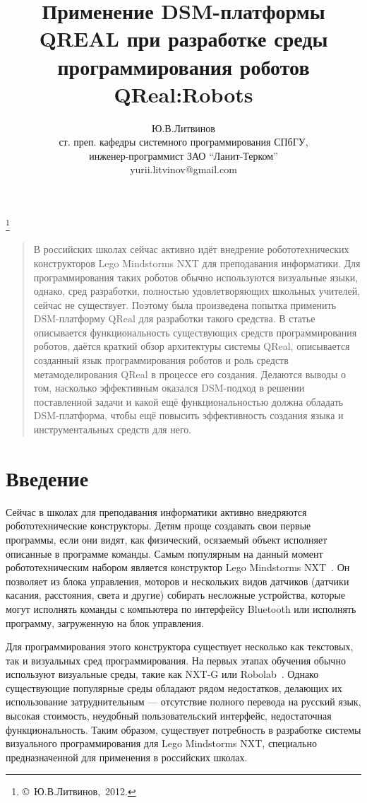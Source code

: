 \documentclass[a4paper]{article}
\title{Применение DSM-платформы QREAL при разработке среды программирования роботов QReal:Robots}
\author{Ю.В.Литвинов \\ ст. преп. кафедры системного программирования СПбГУ, \\ инженер-программист ЗАО ``Ланит-Терком'' \\ yurii.litvinov@gmail.com}
\date{}
\begin{document}
\maketitle
\thispagestyle{empty}

\renewcommand{\thefootnote}{}
\footnote{\small{\copyright~Ю.В.Литвинов,~2012.}}
\renewcommand{\thefootnote}{\arabic{footnote}}
\setcounter{footnote}{0}

\begin{quote}
\small\noindent
В российских школах сейчас активно идёт внедрение робототехнических конструкторов Lego Mindstorms NXT для преподавания информатики. Для программирования таких роботов обычно используются визуальные языки, однако, сред разработки, полностью удовлетворяющих школьных учителей, сейчас не существует. Поэтому была произведена попытка применить DSM-платформу QReal для разработки такого средства. В статье описывается функциональность существующих средств программирования роботов, даётся краткий обзор архитектуры системы QReal, описывается созданный язык программирования роботов и роль средств метамоделирования QReal в процессе его создания. Делаются выводы о том, насколько эффективным оказался DSM-подход в решении поставленной задачи и какой ещё функциональностью должна обладать DSM-платформа, чтобы ещё повысить эффективность создания языка и инструментальных средств для него.
\end{quote}

\section*{Введение}
Сейчас в школах для преподавания информатики активно внедряются робототехнические конструкторы. Детям проще создавать свои первые программы, если они видят, как физический, осязаемый объект исполняет описанные в программе команды. Самым популярным на данный момент робототехническим набором является конструктор Lego Mindstorms NXT~\cite{legoNxt}. Он позволяет из блока управления, моторов и нескольких видов датчиков (датчики касания, расстояния, света и другие) собирать несложные устройства, которые могут исполнять команды с компьютера по интерфейсу Bluetooth или исполнять программу, загруженную на блок управления.

Для программирования этого конструктора существует несколько как текстовых, так и визуальных сред программирования. На первых этапах обучения обычно используют визуальные среды, такие как NXT-G или Robolab~\cite{robolabHome}. Однако существующие популярные среды обладают рядом недостатков, делающих их использование затруднительным --- отсутствие полного перевода на русский язык, высокая стоимость, неудобный пользовательский интерфейс, недостаточная функциональность. Таким образом, существует потребность в разработке системы визуального программирования для Lego Mindstorms NXT, специально предназначенной для применения в российских школах.
\end{document}
